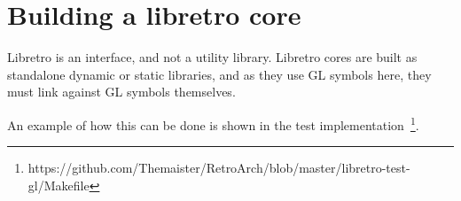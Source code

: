 \documentclass[11pt]{article}
\begin{document}
\section*{Building a libretro core}
Libretro is an interface, and not a utility library. Libretro cores are built as standalone dynamic or static libraries, and as they use GL symbols here, they must link against GL symbols themselves.

An example of how this can be done is shown in the test implementation~\footnote{https://github.com/Themaister/RetroArch/blob/master/libretro-test-gl/Makefile}.
\end{document}
